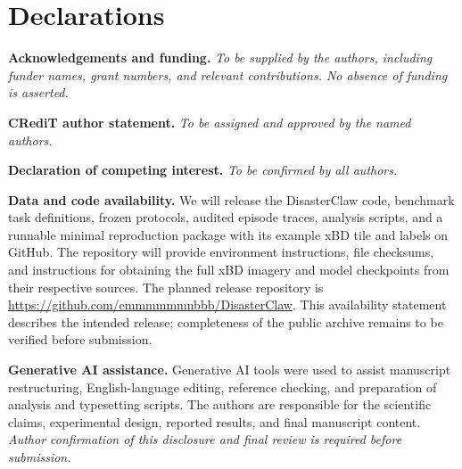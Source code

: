 \section*{Declarations}
\noindent\textbf{Acknowledgements and funding.} \textit{To be supplied by the authors, including funder names, grant numbers, and relevant contributions. No absence of funding is asserted.}

\smallskip\noindent\textbf{CRediT author statement.} \textit{To be assigned and approved by the named authors.}

\smallskip\noindent\textbf{Declaration of competing interest.} \textit{To be confirmed by all authors.}

\smallskip\noindent\textbf{Data and code availability.} We will release the DisasterClaw code, benchmark task definitions, frozen protocols, audited episode traces, analysis scripts, and a runnable minimal reproduction package with its example xBD tile and labels on GitHub. The repository will provide environment instructions, file checksums, and instructions for obtaining the full xBD imagery and model checkpoints from their respective sources. The planned release repository is \url{https://github.com/emmmmmmnbbb/DisasterClaw}. This availability statement describes the intended release; completeness of the public archive remains to be verified before submission.

\smallskip\noindent\textbf{Generative AI assistance.} Generative AI tools were used to assist manuscript restructuring, English-language editing, reference checking, and preparation of analysis and typesetting scripts. The authors are responsible for the scientific claims, experimental design, reported results, and final manuscript content. \textit{Author confirmation of this disclosure and final review is required before submission.}
